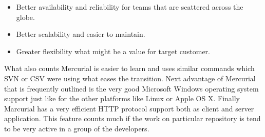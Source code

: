 \begin{itemize}
\item{Better availability and reliability for teams that are scattered across the globe.}
\item{Better scalability and easier to maintain.}
\item{Greater flexibility what might be a value for target customer.}
\end{itemize}
What also counts Mercurial is easier to learn and uses similar commands which SVN or CSV were using what eases the transition. Next advantage of Mercurial that is frequently outlined is the very good Microsoft Windows operating system support just like for the other platforms like Linux or Apple OS X. Finally Marcurial has a very efficient HTTP protocol support \cite{google_hg_git_compare} both as client and server application. This feature counts much if the work on particular repository is tend to be very active in a group of the developers.

